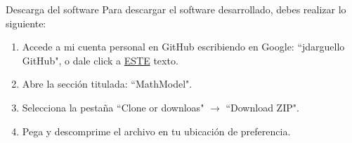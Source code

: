 \begin{frame}[t]{Descarga del software}\vspace{5pt}
Para descargar el software desarrollado, debes realizar lo siguiente:

\begin{enumerate}
	\item Accede a mi cuenta personal en GitHub escribiendo en Google: ``jdarguello GitHub", o dale click a \href{https://github.com/jdarguello?tab=overview&from=2018-10-01to=2018-10-31}{ESTE} texto.
	\item Abre la secci\'on titulada: ``MathModel".
	\item Selecciona la pesta\~na ``Clone or downloas" $\rightarrow$ ``Download ZIP".
	\item Pega y descomprime el archivo en tu ubicaci\'on de preferencia.
\end{enumerate}

\end{frame}